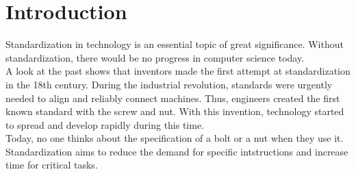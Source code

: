 \section{Introduction}
Standardization in technology is an essential topic of great significance. Without standardization, there would be no progress in computer science today. \\
A look at the past shows that inventors made the first attempt at standardization in the 18th century. During the industrial revolution, standards were urgently needed to align and reliably connect machines. Thus, engineers created the first known standard with the screw and nut. With this invention, technology started to spread and develop rapidly during this time.  \cite{wiki_standardization_2022} \\
Today, no one thinks about the specification of a bolt or a nut when they use it. Standardization aims to reduce the demand for specific intstructions and increase time for critical tasks. \\



%